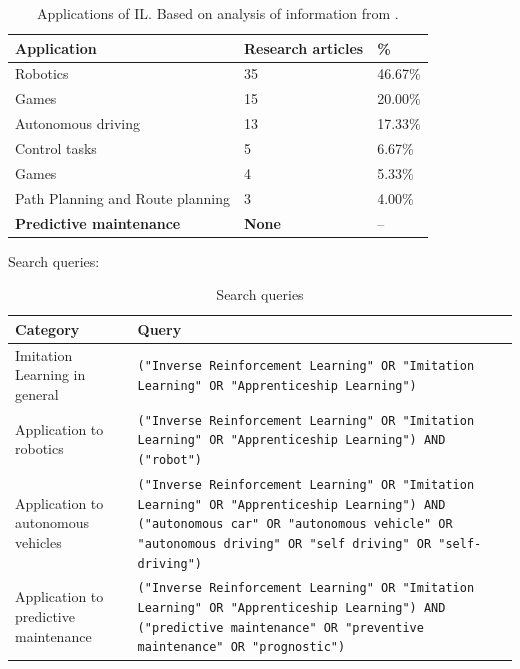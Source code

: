 \documentclass{article}
\begin{document}
\begingroup
\setlength{\tabcolsep}{6pt}
\begin{table}[h!]
	\renewcommand{\arraystretch}{1.5}
	\selectfont
	\begin{tabular}{L{5cm} R{2cm} R{2cm}}
		\midrule[0.01pt]
		\textbf{Application} & \textbf{Research articles} & \textbf{\%} \\ \midrule[0.01pt]
		Robotics & 35 & 46.67\%\\
		Games & 15 & 20.00\%\\
		Autonomous driving & 13 & 17.33\%\\
		Control tasks & 5 & 6.67\%\\
		Games & 4 & 5.33\%\\
		Path Planning and Route planning & 3 & 4.00\%\\
		\textbf{Predictive maintenance} & \textbf{None} & --\\
		\midrule[0.01pt]
	\end{tabular}
	\caption{Applications of IL. Based on analysis of information from \citet{zare2024survey}.} \label{tbl:ZareApplications}
\end{table}
\endgroup

Search queries:
\begingroup
\setlength{\tabcolsep}{6pt}
\begin{table}[h!]
	\renewcommand{\arraystretch}{2.0}
	\selectfont
	\begin{tabular}{L{3cm} L{10cm}}
		\midrule[0.01pt]
		\textbf{Category} & \textbf{Query} \\ \midrule[0.01pt]
		Imitation Learning in general &  \texttt{("Inverse Reinforcement Learning" OR "Imitation Learning" OR "Apprenticeship Learning")} \\
		Application to robotics &  \texttt{("Inverse Reinforcement Learning" OR "Imitation Learning" OR "Apprenticeship Learning") AND ("robot")} \\
		Application to autonomous vehicles &  \texttt{("Inverse Reinforcement Learning" OR "Imitation Learning" OR "Apprenticeship Learning") AND ("autonomous car" OR "autonomous vehicle" OR "autonomous driving" OR "self driving" OR "self-driving")} \\ 
		Application to predictive maintenance &  \texttt{("Inverse Reinforcement Learning" OR "Imitation Learning" OR "Apprenticeship Learning") AND ("predictive maintenance" OR "preventive maintenance" OR "prognostic")} \\ 
		\midrule[0.01pt]
	\end{tabular}
	\caption{Search queries} \label{tbl:SLRQueries}
\end{table}
\endgroup
\end{document}
